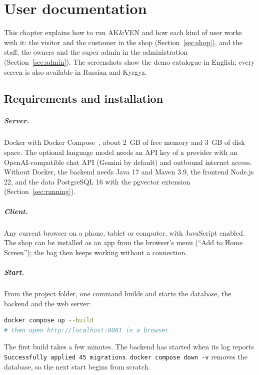 \chapter{User documentation}
\label{ch:user}

This chapter explains how to run AK\&VEN and how each kind of user works with it: the visitor and the customer in the
shop (Section~\ref{sec:shop}), and the staff, the owners and the super admin in the administration
(Section~\ref{sec:admin}). The screenshots show the demo catalogue in English; every screen is also available in
Russian and Kyrgyz.

\section{Requirements and installation}
\label{sec:install}

\paragraph{Server.} Docker with Docker Compose~\cite{docker}, about 2~GB of free memory and 3~GB of disk space. The
optional language model needs an API key of a provider with an OpenAI-compatible chat API (Gemini by default) and
outbound internet access. Without Docker, the backend needs Java 17 and Maven 3.9, the frontend Node.js 22, and the data
PostgreSQL 16 with the pgvector extension (Section~\ref{sec:running}).

\paragraph{Client.} Any current browser on a phone, tablet or computer, with JavaScript enabled. The shop can be
installed as an app from the browser's menu (``Add to Home Screen''); the bag then keeps working without a connection.

\paragraph{Start.} From the project folder, one command builds and starts the database, the backend and the web server:

\begin{lstlisting}[language=bash, caption={Starting the shop}, label=src:start]
docker compose up --build
# then open http://localhost:8081 in a browser
\end{lstlisting}

The first build takes a few minutes. The backend has started when its log reports \texttt{Successfully applied 45
migrations}. \texttt{docker compose down -v} removes the database, so the next start begins from scratch.

